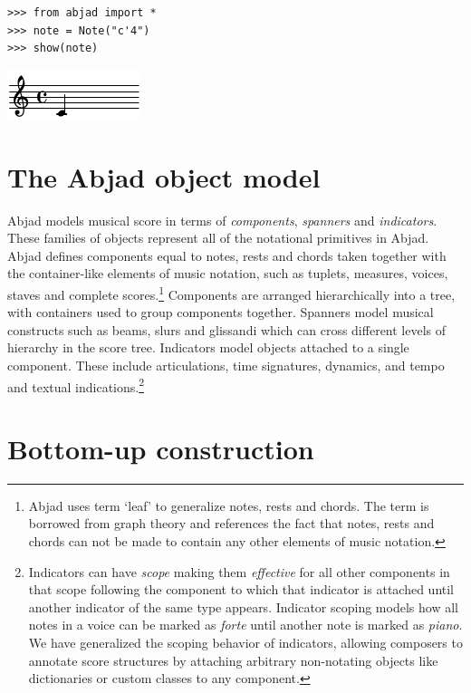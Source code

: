 \documentclass{article}
\begin{document}

\begin{lstlisting}
>>> from abjad import *
>>> note = Note("c'4")
>>> show(note)
\end{lstlisting}
\includegraphics{assets/lilypond-c018a545d264ff34225e9a3a5babb6c1.pdf}

\section{The Abjad object model}

Abjad models musical score in terms of \emph{components}, \emph{spanners} and
\emph{indicators}. These families of objects represent all of the notational
primitives in Abjad. Abjad defines components equal to notes, rests and chords
taken together with the container-like elements of music notation, such as
tuplets, measures, voices, staves and complete scores.\footnote{Abjad uses term
`leaf' to generalize notes, rests and chords. The term is borrowed from graph
theory and references the fact that notes, rests and chords can not be made to
contain any other elements of music notation.} Components are arranged
hierarchically into a tree, with containers used to group components
together. Spanners model musical constructs such as beams, slurs
and glissandi which can cross different levels of hierarchy in the score tree.
Indicators model objects attached to a single component. These include
articulations, time signatures, dynamics, and tempo and textual
indications.\footnote{Indicators can have \emph{scope} making them
\emph{effective} for all other components in that scope following the component
to which that indicator is attached until another indicator of the same type
appears. Indicator scoping models how all notes in a voice can be marked as
\emph{forte} until another note is marked as \emph{piano}. We have generalized
the scoping behavior of indicators, allowing composers to annotate score
structures by attaching arbitrary non-notating objects like dictionaries or
custom classes to any component.}

\section{Bottom-up construction} \label{sec:bottom-up}
\end{document}
